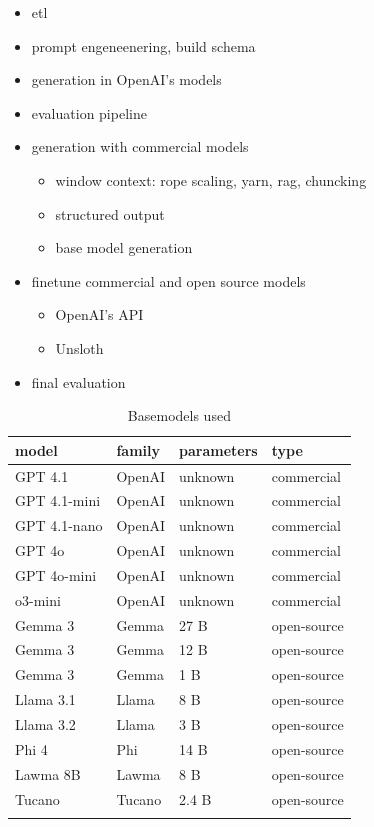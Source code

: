 \documentclass[
  12pt,
  letterpaper,
]{book}
\providecommand{\tightlist}{%
  \setlength{\itemsep}{0pt}\setlength{\parskip}{0pt}}\usepackage{longtable,booktabs,array}
\begin{document}
\begin{itemize}
\tightlist
\item
  etl
\item
  prompt engeneenering, build schema
\item
  generation in OpenAI's models
\item
  evaluation pipeline
\item
  generation with commercial models

  \begin{itemize}
  \tightlist
  \item
    window context: rope scaling, yarn, rag, chuncking
  \item
    structured output
  \item
    base model generation
  \end{itemize}
\item
  finetune commercial and open source models

  \begin{itemize}
  \tightlist
  \item
    OpenAI's API
  \item
    Unsloth
  \end{itemize}
\item
  final evaluation
\end{itemize}

\begin{longtable}[t]{llll}

\toprule
model & family & parameters & type\\
\midrule
GPT 4.1 & OpenAI & unknown & commercial\\
GPT 4.1-mini & OpenAI & unknown & commercial\\
GPT 4.1-nano & OpenAI & unknown & commercial\\
GPT 4o & OpenAI & unknown & commercial\\
GPT 4o-mini & OpenAI & unknown & commercial\\
\addlinespace
o3-mini & OpenAI & unknown & commercial\\
Gemma 3 & Gemma & 27 B & open-source\\
Gemma 3 & Gemma & 12 B & open-source\\
Gemma 3 & Gemma & 1 B & open-source\\
Llama 3.1 & Llama & 8 B & open-source\\
\addlinespace
Llama 3.2 & Llama & 3 B & open-source\\
Phi 4 & Phi & 14 B & open-source\\
Lawma 8B & Lawma & 8 B & open-source\\
Tucano & Tucano & 2.4 B & open-source\\
\bottomrule


\caption{\label{tbl-metadata}Basemodels used}

\tabularnewline
\end{longtable}
\end{document}
